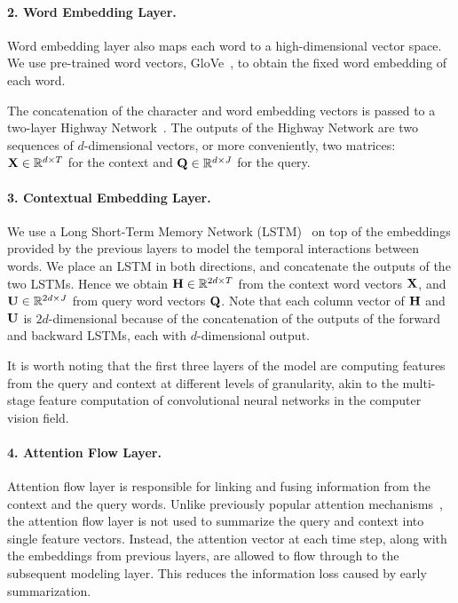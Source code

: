\paragraph{2. Word Embedding Layer.}\label{subsec:emb}
Word embedding layer also maps each word to a high-dimensional vector space. We use pre-trained word vectors, GloVe~\citep{glove}, to obtain the fixed word embedding of each word.

The concatenation of the character and word embedding vectors is passed to a two-layer Highway Network~\citep{highway}. 
The outputs of the Highway Network are two sequences of $d$-dimensional vectors, or more conveniently, two matrices: ${\bf X} \in \mathbb{R}^{d \times T}$ for the context and ${\bf Q} \in \mathbb{R}^{d \times J}$ for the query.

\paragraph{3. Contextual Embedding Layer.}\label{subsec:pre}
We use a Long Short-Term Memory Network (LSTM)~\citep{lstm} on top of the embeddings provided by the previous layers to model the temporal interactions between words. %
We place an LSTM in both directions, and concatenate the outputs of the two LSTMs. Hence we obtain ${\bf H} \in \mathbb{R}^{2d \times T}$ from the context word vectors ${\bf X}$, and ${\bf U} \in \mathbb{R}^{2d \times J}$ from query word vectors ${\bf Q}$.
Note that each column vector of ${\bf H}$ and ${\bf U}$ is $2d$-dimensional because of the concatenation of the outputs of the forward and backward LSTMs, each with $d$-dimensional output.

It is worth noting that the first three layers of the model are computing features from the query and context at different levels of granularity, akin to the multi-stage feature computation of convolutional neural networks in the computer vision field.

\paragraph{4. Attention Flow Layer.}\label{subsec:att}
Attention flow layer is responsible for linking and fusing information from the context and the query words. 
Unlike previously popular attention mechanisms~\citep{memnn,hill2015goldilocks,iterative,reasonet}, the attention flow layer is not used to summarize the query and context into single feature vectors. 
Instead, the attention vector at each time step, along with the embeddings from previous layers, are allowed to flow through to the subsequent modeling layer. 
This reduces the information loss caused by early summarization.
 
